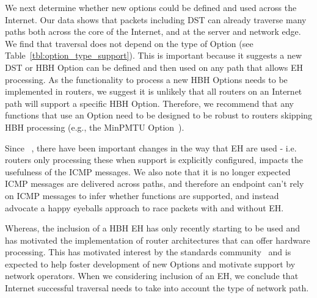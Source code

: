 \documentclass[conference]{IEEEtran}
\begin{document}
We next determine whether new options could be defined and used across the Internet.
Our  data  shows that packets including DST can already traverse many paths both across the core of the Internet, and at the server and network edge. 
We find that traversal does not depend on the type of Option  (see Table~\ref{tbl:option_type_support}). This is important because it suggests a new DST or HBH Option can be defined and then used on any path that allows EH processing. 
As the functionality to process a new HBH Options needs to be implemented in routers, we suggest it is unlikely that all routers on an Internet path will support a specific HBH Option. Therefore, we recommend that any functions that use an Option need to be designed to be robust to routers skipping HBH processing (e.g., the MinPMTU  Option~\cite{rfc9268,rfc9343}). 


Since ~\cite{rfc2460}, there have been important changes in the way that EH are used - i.e. routers only processing these when support is explicitly configured, impacts the usefulness of the ICMP messages. We also note that it is no longer expected ICMP messages are delivered across paths, and therefore an endpoint can't rely on ICMP messages to infer whether functions are supported, and instead advocate a happy eyeballs approach to race packets with and without EH.


Whereas, the inclusion of a HBH EH has only recently starting to be used and has motivated the implementation of router architectures that can offer hardware processing. This has motivated interest by the standards community~\cite{ietf-6man-HBH-processing-06, ietf-v6ops-hbh-03, ietf-6man-eh-limits-02} and is expected to help foster development of new Options and motivate support by network operators. When we considering inclusion of an EH, we conclude that Internet successful traversal needs to take into account the type of network path.
\end{document}
